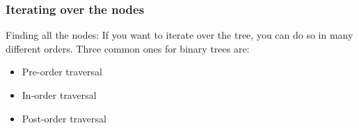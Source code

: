 




\begin{frame}
	\frametitle{Iterating over the nodes}
	
		Finding all the nodes: If you want to iterate over the tree, you can do so in many different orders. Three common ones for binary trees are:
			\begin{itemize}
				\item Pre-order traversal
				\item In-order traversal
				\item Post-order traversal
			\end{itemize}
\end{frame}

